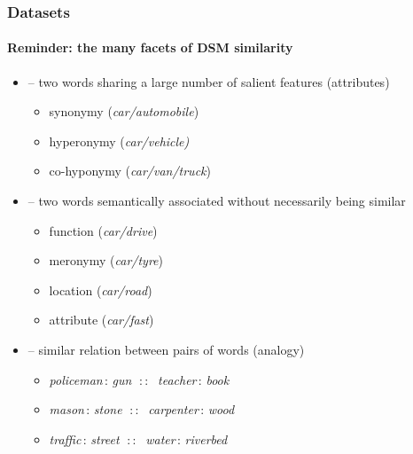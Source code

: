 \documentclass[t]{beamer} %
\begin{document}
\begin{frame}
  \frametitle{Datasets}
  \framesubtitle{Reminder: the many facets of DSM similarity}

  \ungap[1]
  \begin{itemize}
  \item {} -- two words sharing a large number of salient features (attributes)
    \begin{itemize}
    \item synonymy (\emph{car/automobile})
    \item hyperonymy (\emph{car/vehicle)}
    \item co-hyponymy (\emph{car/van/truck})
    \end{itemize}

  \item {} \citep{Budanitsky:Hirst:06} -- two words semantically associated without necessarily being similar
    \begin{itemize}
    \item function (\emph{car/drive})
    \item meronymy (\emph{car/tyre})
    \item location (\emph{car/road})
    \item attribute (\emph{car/fast})
    \end{itemize}

  \item {} \citep{Turney:06} -- similar relation between pairs of words (analogy)
    \begin{itemize}
    \item \emph{policeman}$\,:\,$\emph{gun} $\;::\;$ \emph{teacher}$\,:\,$\emph{book}
    \item \emph{mason}$\,:\,$\emph{stone} $\;::\;$ \emph{carpenter}$\,:\,$\emph{wood}
    \item \emph{traffic}$\,:\,$\emph{street} $\;::\;$ \emph{water}$\,:\,$\emph{riverbed}
    \end{itemize}
  \end{itemize}
\end{frame}
\end{document}
